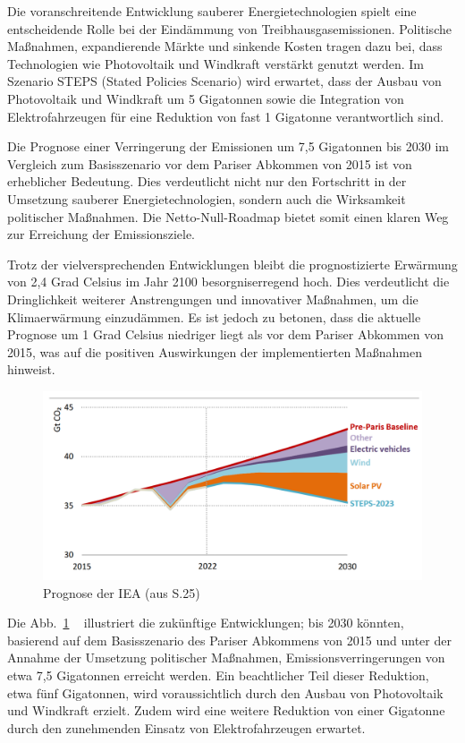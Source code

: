 \documentclass{article}
\begin{document}
Die voranschreitende Entwicklung sauberer Energietechnologien spielt eine entscheidende Rolle bei der Eindämmung von Treibhausgasemissionen. Politische Maßnahmen, expandierende Märkte und sinkende Kosten tragen dazu bei, dass Technologien wie Photovoltaik und Windkraft verstärkt genutzt werden. Im Szenario STEPS (Stated Policies Scenario) wird erwartet, dass der Ausbau von Photovoltaik und Windkraft um 5 Gigatonnen sowie die Integration von Elektrofahrzeugen für eine Reduktion von fast 1 Gigatonne verantwortlich sind.

Die Prognose einer Verringerung der Emissionen um 7,5 Gigatonnen bis 2030 im Vergleich zum Basisszenario vor dem Pariser Abkommen von 2015 ist von erheblicher Bedeutung. Dies verdeutlicht nicht nur den Fortschritt in der Umsetzung sauberer Energietechnologien, sondern auch die Wirksamkeit politischer Maßnahmen. Die Netto-Null-Roadmap bietet somit einen klaren Weg zur Erreichung der Emissionsziele.

Trotz der vielversprechenden Entwicklungen bleibt die prognostizierte Erwärmung von 2,4 Grad Celsius im Jahr 2100 besorgniserregend hoch. Dies verdeutlicht die Dringlichkeit weiterer Anstrengungen und innovativer Maßnahmen, um die Klimaerwärmung einzudämmen. Es ist jedoch zu betonen, dass die aktuelle Prognose um 1 Grad Celsius niedriger liegt als vor dem Pariser Abkommen von 2015, was auf die positiven Auswirkungen der implementierten Maßnahmen hinweist.

\begin{figure}
		\includegraphics[width=1.00\textwidth]{../Figures/global-energy-sector-CO2-emissions-in-the-pre-paris-baseline-and-stated-policies-scenarios-2015-2030.png}
	\caption{Prognose der IEA (aus \cite{iea_net_zero2023PDF} S.25)
	\label{fig:global-energy-sector-CO2-emissions}}
\end{figure}

Die Abb.~\ref{fig:global-energy-sector-CO2-emissions} ~ illustriert die zukünftige Entwicklungen;  bis 2030 könnten, basierend auf dem Basisszenario des Pariser Abkommens von 2015 und unter der Annahme der Umsetzung politischer Maßnahmen, Emissionsverringerungen von etwa 7,5 Gigatonnen erreicht werden. Ein beachtlicher Teil dieser Reduktion, etwa fünf Gigatonnen, wird voraussichtlich durch den Ausbau von Photovoltaik und Windkraft erzielt. Zudem wird eine weitere Reduktion von einer Gigatonne durch den zunehmenden Einsatz von Elektrofahrzeugen erwartet.
\end{document}
